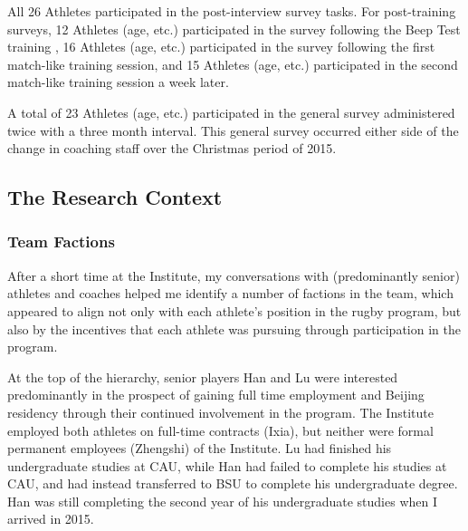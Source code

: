     All 26 Athletes participated in the post-interview survey tasks.  For post-training surveys, 12 Athletes (age, etc.) participated in the survey following the Beep Test training , 16 Athletes (age, etc.) participated in the survey following the first match-like training session, and 15 Athletes (age, etc.) participated in the second match-like training session a week later.

    A total of 23 Athletes (age, etc.) participated in the general survey administered twice with a three month interval. This general survey occurred either side of the change in coaching staff over the Christmas period of 2015.




  \subsection{The Research Context}


  \subsubsection{Team Factions}

  After a short time at the Institute, my conversations with (predominantly senior) athletes and coaches helped me identify a number of factions in the team, which appeared to align not only with each athlete's position in the rugby program, but also by the incentives that each athlete was pursuing through participation in the program.

  At the top of the hierarchy, senior players Han and Lu were interested predominantly in the prospect of gaining full time employment and Beijing residency through their continued involvement in the program. The Institute employed both athletes on full-time contracts (Ixia), but neither were formal permanent employees (Zhengshi) of the Institute.  Lu had finished his undergraduate studies at CAU, while Han had failed to complete his studies at CAU, and had instead transferred to BSU to complete his undergraduate degree. Han was still completing the second year of his undergraduate studies when I arrived in 2015.

